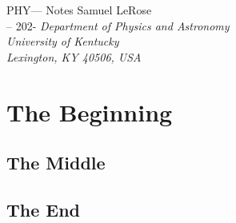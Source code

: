 \documentclass[12pt]{article}
\newcommand{\name}{Samuel LeRose}              %
\newcommand{\semester}{-- 202-}        %
\newcommand{\hwTitle}{PHY--- Notes}  %
\begin{document}
\begin{titlepage}
\begin{center}
    \vspace*{1.5in}
    {\Large{\hwTitle}}
    \vskip 0.25in \name\\
    \semester
    \vskip 0.25in {\it Department of Physics and Astronomy\\ University of Kentucky\\ Lexington, KY 40506, USA}
\end{center}
\vskip 0.5in
\end{titlepage}


\chapter{The Beginning}

\section{The Middle}



\section[3]{The End}    %

\end{document}
